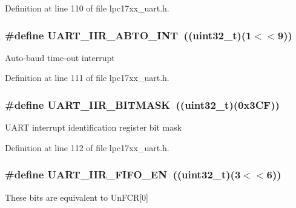 \-Definition at line 110 of file lpc17xx\-\_\-uart.\-h.

\hypertarget{group___u_a_r_t___private___macros_ga29486c78b0afdb4b3943defe36d5404c}{
\subsubsection[{\-U\-A\-R\-T\-\_\-\-I\-I\-R\-\_\-\-A\-B\-T\-O\-\_\-\-I\-N\-T}]{\setlength{\rightskip}{0pt plus 5cm}\#define {\bf \-U\-A\-R\-T\-\_\-\-I\-I\-R\-\_\-\-A\-B\-T\-O\-\_\-\-I\-N\-T}~((uint32\-\_\-t)(1$<$$<$9))}}\label{group___u_a_r_t___private___macros_ga29486c78b0afdb4b3943defe36d5404c}
\-Auto-\/baud time-\/out interrupt 

\-Definition at line 111 of file lpc17xx\-\_\-uart.\-h.

\hypertarget{group___u_a_r_t___private___macros_gad443b74131fa7b7aecf0f1c581172faa}{
\subsubsection[{\-U\-A\-R\-T\-\_\-\-I\-I\-R\-\_\-\-B\-I\-T\-M\-A\-S\-K}]{\setlength{\rightskip}{0pt plus 5cm}\#define {\bf \-U\-A\-R\-T\-\_\-\-I\-I\-R\-\_\-\-B\-I\-T\-M\-A\-S\-K}~((uint32\-\_\-t)(0x3\-C\-F))}}\label{group___u_a_r_t___private___macros_gad443b74131fa7b7aecf0f1c581172faa}
\-U\-A\-R\-T interrupt identification register bit mask 

\-Definition at line 112 of file lpc17xx\-\_\-uart.\-h.

\hypertarget{group___u_a_r_t___private___macros_ga29b20e73585acb416f112502d29554d7}{
\subsubsection[{\-U\-A\-R\-T\-\_\-\-I\-I\-R\-\_\-\-F\-I\-F\-O\-\_\-\-E\-N}]{\setlength{\rightskip}{0pt plus 5cm}\#define {\bf \-U\-A\-R\-T\-\_\-\-I\-I\-R\-\_\-\-F\-I\-F\-O\-\_\-\-E\-N}~((uint32\-\_\-t)(3$<$$<$6))}}\label{group___u_a_r_t___private___macros_ga29b20e73585acb416f112502d29554d7}
\-These bits are equivalent to \-Un\-F\-C\-R\mbox{[}0\mbox{]} 


